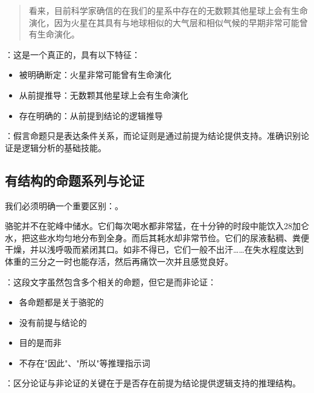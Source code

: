 \begin{examplebox}[title=真正的论证]
\begin{quotation}
看来，目前科学家确信的在我们的星系中存在的无数颗其他星球上会有生命演化，因为火星在其具有与地球相似的大气层和相似气候的早期非常可能曾有生命演化。\cite{zare1996}
\end{quotation}

：这是一个真正的，具有以下特征：
\begin{itemize}
  \item {}被明确断定：火星非常可能曾有生命演化
  \item {}从前提推导：无数颗其他星球上会有生命演化
  \item 存在明确的：从前提到结论的逻辑推导
\end{itemize}
\end{examplebox}

：假言命题只是表达条件关系，而论证则是通过前提为结论提供支持。准确识别论证是逻辑分析的基础技能。

\subsection{有结构的命题系列与论证}

我们必须明确一个重要区别：。

\begin{examplebox}[title=非论证的命题系列]
\begin{displayquote}
骆驼并不在驼峰中储水。它们每次喝水都非常猛，在十分钟的时段中能饮入28加仑水，把这些水均匀地分布到全身。而后其耗水却非常节俭。它们的尿液黏稠、粪便干燥，并以浅呼吸而紧闭其口。如非不得已，它们一般不出汗……在失水程度达到体重的三分之一时也能存活，然后再痛饮一次并且感觉良好。\cite{langewiesche1996}
\end{displayquote}

：这段文字虽然包含多个相关的命题，但它是而非论证：
\begin{itemize}
  \item 各命题都是关于骆驼的
  \item 没有前提与结论的
  \item 目的是而非
  \item 不存在"因此"、"所以"等推理指示词
\end{itemize}
\end{examplebox}

：区分论证与非论证的关键在于是否存在前提为结论提供逻辑支持的推理结构。

